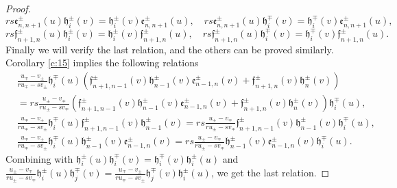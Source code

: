 \documentclass[10pt,a4paper]{amsart}
\numberwithin{equation}{section}
\begin{document}
\begin{proof}
$$
r s \mathfrak{e}_{n, n+1}^{ \pm}(u) \mathfrak{h}_i^{ \pm}(v)=\mathfrak{h}_i^{ \pm}(v) \mathfrak{e}_{n, n+1}^{ \pm}(u), \quad r s \mathfrak{e}_{n, n+1}^{ \pm}(u) \mathfrak{h}_i^{\mp}(v)=\mathfrak{h}_i^{\mp}(v) \mathfrak{e}_{n, n+1}^{ \pm}(u),
$$
$$
r s \mathfrak{f}_{n+1, n}^{ \pm}(u) \mathfrak{h}_i^{ \pm}(v)=\mathfrak{h}_i^{ \pm}(v) \mathfrak{f}_{n+1, n}^{ \pm}(u), \quad r s \mathfrak{f}_{n+1, n}^{ \pm}(u) \mathfrak{h}_i^{\mp}(v)=\mathfrak{h}_i^{\mp}(v) \mathfrak{f}_{n+1, n}^{ \pm}(u).
$$
Finally we will verify the last relation, and the others can be proved similarly. Corollary \ref{c:15} implies the following relations
\begin{align*}
	&\frac{u_{ \mp}-v_{\pm}}{r u_{ \mp}-s v_{\pm}}\mathfrak{h}_i^{\mp}(u)\left(\mathfrak{f}_{n+1, n-1}^{ \pm}(v) \mathfrak{h}_{n-1}^{ \pm}(v) \mathfrak{e}_{n-1, n}^{ \pm}(v)+\mathfrak{f}_{n+1, n}^{ \pm}(v) \mathfrak{h}_n^{ \pm}(v)\right)\\
	&=r s\frac{u_{\pm}-v_{ \mp}}{r u_{\pm}-s v_{ \mp}} \left(\mathfrak{f}_{n+1, n-1}^{ \pm}(v) \mathfrak{h}_{n-1}^{ \pm}(v) \mathfrak{e}_{n-1, n}^{ \pm}(v)+\mathfrak{f}_{n+1, n}^{ \pm}(v) \mathfrak{h}_n^{ \pm}(v)\right) \mathfrak{h}_i^{\mp}(u),\\
	&\frac{u_{ \mp}-v_{\pm}}{r u_{ \mp}-s v_{\pm}}\mathfrak{h}_i^{\mp}(u) \mathfrak{f}_{n+1, n-1}^{ \pm}(v) \mathfrak{h}_{n-1}^{ \pm}(v)=r s\frac{u_{\pm}-v_{ \mp}}{r u_{\pm}-s v_{ \mp}} \mathfrak{f}_{n+1, n-1}^{ \pm}(v) \mathfrak{h}_{n-1}^{ \pm}(v) \mathfrak{h}_i^{\mp}(u),\\
	&\frac{u_{ \mp}-v_{\pm}}{r u_{ \mp}-s v_{\pm}}\mathfrak{h}_i^{\mp}(u) \mathfrak{h}_{n-1}^{ \pm}(v) \mathfrak{e}_{n-1, n}^{ \pm}(v)=r s \frac{u_{\pm}-v_{ \mp}}{r u_{\pm}-s v_{ \mp}} \mathfrak{h}_{n-1}^{ \pm}(v) \mathfrak{e}_{n-1, n}^{ \pm}(v) \mathfrak{h}_i^{\mp}(u).
\end{align*}
Combining with $\mathfrak{h}_i^{ \pm}(u) \mathfrak{h}_i^{\mp}(v)=\mathfrak{h}_i^{\mp}(v) \mathfrak{h}_i^{ \pm}(u)$ and $\frac{u_{ \pm}-v_{\mp}}{r u_{ \pm}-s v_{\mp}} \mathfrak{h}_i^{ \pm}(u) \mathfrak{h}_j^{\mp}(v)=\frac{u_{\mp}-v_{ \pm}}{r u_{\mp}-s v_{ \pm}} \mathfrak{h}_j^{\mp}(v) \mathfrak{h}_i^{ \pm}(u)$, we get the last relation.


\end{proof}
\end{document}
